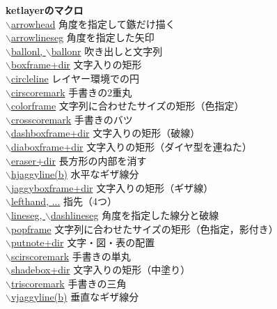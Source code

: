 \documentclass[a4j,12pt,dvipdfmx]{ujarticle}
\newcommand{\bs}{$\backslash$}
\begin{document}
\begin{tabbing}
{\bf ketlayerのマクロ} \> \\
\hyperlink{arrowhead}{\bs arrowhead} \> 角度を指定して鏃だけ描く\\
\hyperlink{arrowhead}{\bs arrowlineseg} \> 角度を指定した矢印\\
\hyperlink{ballon}{\bs ballonl, \bs ballonr} \> 吹き出しと文字列\\
\hyperlink{boxframe}{\bs boxframe+dir} \> 文字入りの矩形\\
\hyperlink{circleline}{\bs circleline} \> レイヤー環境での円\\
\hyperlink{cirscoremark}{\bs cirscoremark} \> 手書きの2重丸\\
\hyperlink{colorframe}{\bs colorframe} \> 文字列に合わせたサイズの矩形（色指定）\\
\hyperlink{crosscoremark}{\bs crosscoremark} \> 手書きのバツ\\
\hyperlink{dashboxframe}{\bs dashboxframe+dir} \> 文字入りの矩形（破線）\\
\hyperlink{diaboxframe}{\bs diaboxframe+dir} \> 文字入りの矩形（ダイヤ型を連ねた）\\
\hyperlink{eraser}{\bs eraser+dir} \> 長方形の内部を消す\\
\hyperlink{hjaggyline}{\bs hjaggyline(b)} \> 水平なギザ線分\\
\hyperlink{jaggyboxframe}{\bs jaggyboxframe+dir} \> 文字入りの矩形（ギザ線）\\
\hyperlink{lefthand}{\bs lefthand, ...} \> 指先（4つ）\\
\hyperlink{lineseg}{\bs lineseg, \bs dashlineseg} \> 角度を指定した線分と破線\\
\hyperlink{popframe}{\bs popframe} \> 文字列に合わせたサイズの矩形（色指定，影付き）\\
\hyperlink{putnote}{\bs putnote+dir} \> 文字・図・表の配置\\
\hyperlink{scirscoremark}{\bs scirscoremark} \> 手書きの単丸\\
\hyperlink{shadebox}{\bs shadebox+dir} \> 文字入りの矩形（中塗り）\\
\hyperlink{triscoremark}{\bs triscoremark} \> 手書きの三角\\
\hyperlink{vjaggyline}{\bs vjaggyline(b)} \> 垂直なギザ線分\\


\end{tabbing}
\end{document}
